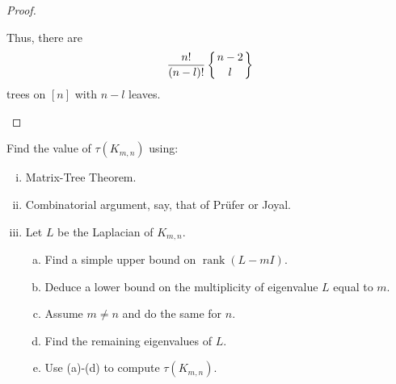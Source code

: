 \documentclass[11pt]{article}
\begin{document}
\begin{proof}
\begin{enumerate}[(a)]
        Thus, there are \[\frac{n!}{(n-l)!}\left\{\genfrac{}{}{0pt}{}{n-2}{l}\right\}\] trees on $[n]$ with $n-l$ leaves.
    \end{enumerate}
\end{proof}
\begin{quest}
    Find the value of $\tau(K_{m,n})$ using:
    \begin{enumerate}[(i)]
        \item Matrix-Tree Theorem.
        \item Combinatorial argument, say, that of Prüfer or Joyal.
        \item Let $L$ be the Laplacian of $K_{m,n}$.
            \begin{enumerate}[(a)]
                \item Find a simple upper bound on $\mathop{\mathrm{rank}}(L-mI)$.
                \item Deduce a lower bound on the multiplicity of eigenvalue $L$ equal to $m$.
                \item Assume $m\neq n$ and do the same for $n$.
                \item Find the remaining eigenvalues of $L$.
                \item Use (a)-(d) to compute $\tau(K_{m,n})$.
            \end{enumerate}
    \end{enumerate}
\end{quest}
\end{document}

